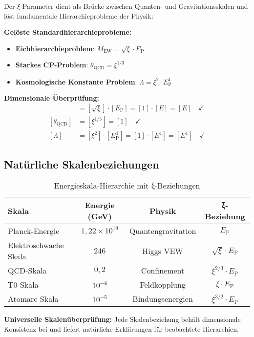 \documentclass[12pt,a4paper]{report}
\newcommand{\EP}{E_{\text{P}}}            %
\begin{document}
	Der $\xi$-Parameter dient als Brücke zwischen Quanten- und Gravitationsskalen und löst fundamentale Hierarchieprobleme der Physik:
	
	\textbf{Gelöste Standardhierarchieprobleme:}
	\begin{itemize}
		\item \textbf{Eichhierarchieproblem}: $M_{\text{EW}} = \sqrt{\xi} \cdot \EP$
		\item \textbf{Starkes CP-Problem}: $\theta_{\text{QCD}} = \xi^{1/3}$
		\item \textbf{Kosmologische Konstante Problem}: $\Lambda = \xi^2 \cdot \EP^4$
	\end{itemize}
	
	\textbf{Dimensionale Überprüfung:}
	\begin{align}
		[M_{\text{EW}}] &= [\sqrt{\xi}] \cdot [\EP] = [1] \cdot [E] = [E] \quad \checkmark \\
		[\theta_{\text{QCD}}] &= [\xi^{1/3}] = [1] \quad \checkmark \\
		[\Lambda] &= [\xi^2] \cdot [\EP^4] = [1] \cdot [E^4] = [E^4] \quad \checkmark
	\end{align}
	
	\subsection{Natürliche Skalenbeziehungen}
	\label{subsec:natural_scale_relationships}
	
	\begin{table}[htbp]
		\centering
		\begin{tabular}{lccc}
			\toprule
			\textbf{Skala} & \textbf{Energie (GeV)} & \textbf{Physik} & \textbf{ξ-Beziehung} \\
			\midrule
			Planck-Energie & $1,22 \times 10^{19}$ & Quantengravitation & $\EP$ \\
			Elektroschwache Skala & $246$ & Higgs VEW & $\sqrt{\xi} \cdot \EP$ \\
			QCD-Skala & $0,2$ & Confinement & $\xi^{2/3} \cdot \EP$ \\
			T0-Skala & $10^{-4}$ & Feldkopplung & $\xi \cdot \EP$ \\
			Atomare Skala & $10^{-5}$ & Bindungsenergien & $\xi^{3/2} \cdot \EP$ \\
			\bottomrule
		\end{tabular}
		\caption{Energieskala-Hierarchie mit ξ-Beziehungen}
		\label{tab:energy_scales}
	\end{table}
	
	\textbf{Universelle Skalenüberprüfung:}
	Jede Skalenbeziehung behält dimensionale Konsistenz bei und liefert natürliche Erklärungen für beobachtete Hierarchien.
	
\end{document}
